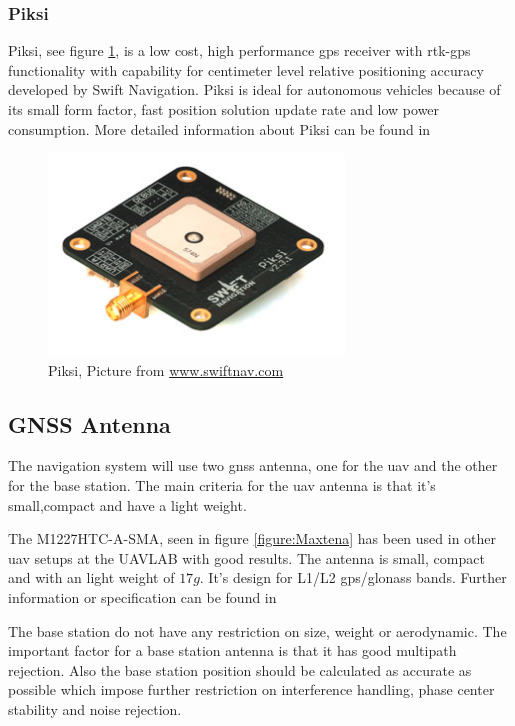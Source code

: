 \subsubsection{Piksi}\label{ss:Piksi}
Piksi, see figure \ref{figure:Piksi}, is a low cost, high performance \gls{gps} receiver with \gls{rtk-gps} functionality with capability for centimeter level relative positioning accuracy developed by Swift Navigation. Piksi is ideal for autonomous vehicles because of its small form factor, fast position solution update rate and low power consumption. 
More detailed information about Piksi can be found in \citep{Piksiv231}
\begin{figure}[H]
	\centering
		\includegraphics[width=0.7\textwidth]{figs/piksi_top.jpg}
		\caption{Piksi, Picture from \url{www.swiftnav.com}}
		\label{figure:Piksi}
\end{figure}
\subsection{GNSS Antenna}
The navigation system will use two \gls{gnss} antenna, one for the \gls{uav} and the other for the base station. The main criteria for the \gls{uav} antenna is that it's small,compact and have a light weight.

The M1227HTC-A-SMA, seen in figure \ref{figure:Maxtena} has been used in other \gls{uav} setups at the UAVLAB with good results. The antenna is small, compact and with an light weight of $17g$. It's design for L1/L2 gps/glonass bands. Further information or specification can be found in \citep{maxtena}

The base station do not have any restriction on size, weight or aerodynamic. The important factor for a base station antenna is that it has good multipath rejection. Also the base station position should be calculated as accurate as possible which impose further restriction on interference handling, phase center stability and noise rejection.

